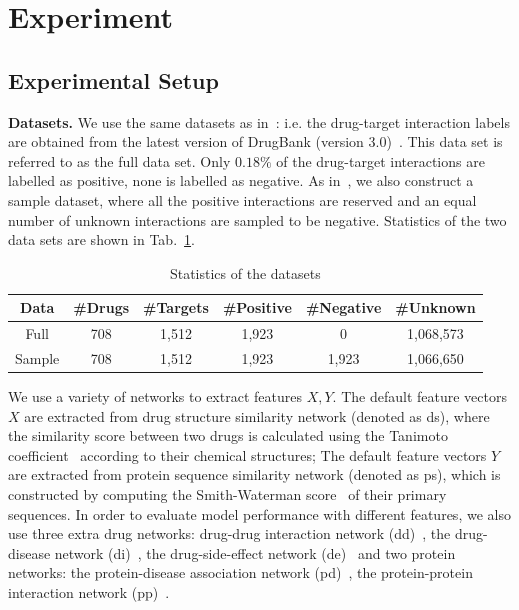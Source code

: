 \documentclass[conference]{IEEEtran}
\begin{document}
\section{Experiment}\label{sec:experiment}
\subsection{Experimental Setup}


\textbf{Datasets.} 
We use the same datasets as in~\cite{Luo2017Network}: i.e. the drug-target interaction labels are obtained from the latest version of DrugBank (version 3.0)~\cite{Knox2011DrugBank}. This data set is referred to as the full data set. Only $0.18\%$ of the drug-target interactions are labelled as positive, none is labelled as negative. As in~\cite{Luo2017Network}, we also construct a sample dataset, where all the positive interactions are reserved and an equal number of unknown interactions are sampled to be negative. Statistics of the two data sets are shown in Tab.~\ref{tab:data}. 
\begin{table}[htp]
\caption{Statistics of the datasets}\label{tab:data}
\vspace*{-10pt}
\small
\begin{tabular}{|c|c|c|c|c|c|}
\hline
Data & \#Drugs & \#Targets & \#Positive & \#Negative & \#Unknown \\\hline
Full & 708 & 1,512 & 1,923 & 0 & 1,068,573 \\\hline
Sample & 708 & 1,512 & 1,923 & 1,923 & 1,066,650 \\\hline
\end{tabular}
\vspace*{-5pt}
\end{table}%

We use a variety of networks to extract features $X,Y$. The default feature vectors $X$ are extracted from drug structure similarity network (denoted as ds), where the similarity score between two drugs is calculated using the Tanimoto coefficient~\cite{Hattori2003Drug} according to their chemical structures; The default feature vectors $Y$ are extracted from protein sequence similarity network (denoted as ps), which is constructed by computing the Smith-Waterman score~\cite{Smith1981Protein} of their primary sequences. In order to evaluate model performance with different features, we also use three extra drug networks: drug-drug interaction network (dd)~\cite{Knox2011DrugBank}, the drug-disease network (di)~\cite{Davis2012DrugDisease}, the drug-side-effect network (de)~\cite{Kuhn2010DrugSideEffect} and two protein networks: the protein-disease association network (pd)~\cite{Davis2012DrugDisease}, the protein-protein interaction network (pp)~\cite{Keshava2009ProteinInteration}. 
\end{document}
